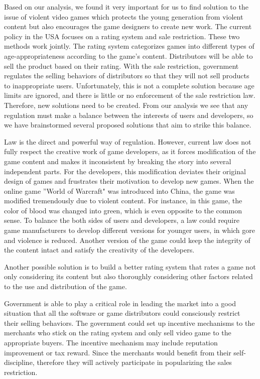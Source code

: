 \indent\indent Based on our analysis, we found it very important for us to find solution to the issue of violent video games which protects the young generation from violent content but also encourages the game designers to create new work. The current policy in the USA focuses on a rating system and sale restriction. These two methods work jointly. The rating system categorizes games into different types of age-appropriateness according to the game's content. Distributors will be able to sell the product based on their rating. With the sale restriction, government regulates the selling behaviors of distributors so that they will not sell products to inappropriate users. \textcolor{ProcessBlue}{Unfortunately, this is not a complete solution because age limits are ignored, and there is little or no enforcement of the sale restriction law. Therefore, new solutions need to be created. From our analysis we see that any regulation must make a balance between the interests of users and developers, so we have brainstormed several proposed solutions that aim to strike this balance. }

Law is the direct and powerful way of regulation. However, current law  does not fully respect the creative work of game developers, as it forces modification of the game content and makes it inconsistent by breaking the story into several independent parts. For the developers, this modification deviates their original design of games and frustrates their motivation to develop new games. When the online game ''World of Warcraft" was introduced into China, the game was modified tremendously due to violent content. For instance, in this game, the color of blood was changed into green, which is even opposite to the common sense. To balance the both sides of users and developers, a law could require game manufacturers to develop different versions for younger users, in which gore and violence is reduced. Another version of the game could keep the integrity of the content intact and satisfy the creativity of the developers. 

Another possible solution is to build a better rating system that rates a game not only considering its content but also thoroughly considering other factors related to the use and distribution of the game. 

Government is able to play a critical role in leading the market into a good situation that all the software or game distributors could consciously restrict their selling behaviors. The government could set up incentive mechanisms to the merchants who stick on the rating system and only sell video game to the appropriate buyers. The incentive mechanism may include reputation improvement or tax reward. Since the merchants would benefit from their self-discipline, therefore they will actively participate in popularizing the sales restriction.

